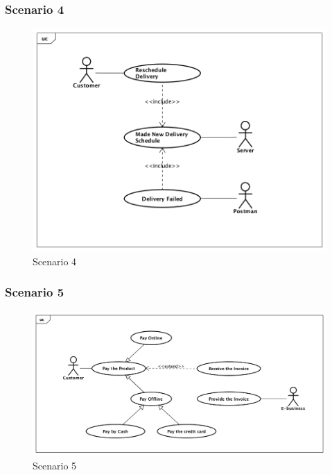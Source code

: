 \documentclass[12pt]{scrreprt}
\begin{document}
\subsubsection{Scenario 4}
\begin{figure}[htbp]
  \centering\includegraphics[width=6in]{DocumentRes/Scenario4.png}
  \caption{Scenario 4}
\end{figure}

\subsubsection{Scenario 5}
\begin{figure}[htbp]
  \centering\includegraphics[width=6in]{DocumentRes/Scenario5.png}
  \caption{Scenario 5}
\end{figure}
\end{document}
